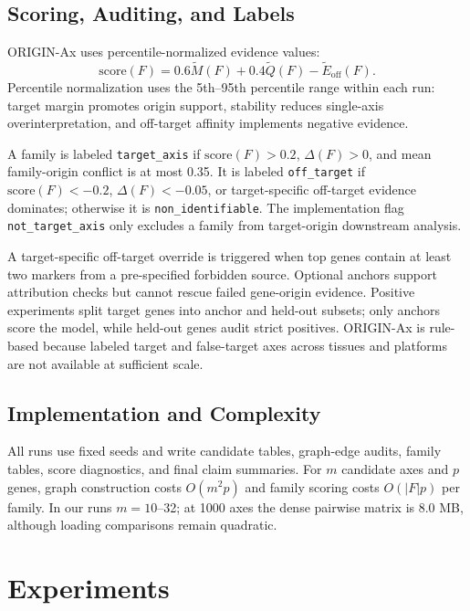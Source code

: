 \documentclass[conference]{IEEEtran}
\begin{document}
\subsection{Scoring, Auditing, and Labels}

ORIGIN-Ax uses percentile-normalized evidence values:
\begin{equation}
\mathrm{score}(F)=0.6\widetilde{M}(F)+0.4\widetilde{Q}(F)
-\widetilde{E}_{\mathrm{off}}(F).
\end{equation}
Percentile normalization uses the 5th--95th percentile range within each run:
target margin promotes origin support, stability reduces single-axis
overinterpretation, and off-target affinity implements negative evidence.

A family is labeled \texttt{target\_axis} if $\mathrm{score}(F)>0.2$,
$\Delta(F)>0$, and mean family-origin conflict is at most 0.35. It is labeled
\texttt{off\_target} if $\mathrm{score}(F)<-0.2$, $\Delta(F)<-0.05$, or
target-specific off-target evidence dominates; otherwise it is
\texttt{non\_identifiable}. The implementation flag \texttt{not\_target\_axis}
only excludes a family from target-origin downstream analysis.

A target-specific off-target override is triggered when top genes contain at
least two markers from a pre-specified forbidden source. Optional anchors support
attribution checks but cannot rescue failed gene-origin evidence. Positive
experiments split target genes into anchor and held-out subsets; only anchors
score the model, while held-out genes audit strict positives. ORIGIN-Ax is
rule-based because labeled target and false-target axes across tissues and
platforms are not available at sufficient scale.

\subsection{Implementation and Complexity}

All runs use fixed seeds and write candidate tables, graph-edge audits, family
tables, score diagnostics, and final claim summaries. For $m$ candidate axes and
$p$ genes, graph construction costs $O(m^2p)$ and family scoring costs
$O(|F|p)$ per family. In our runs $m=10$--32; at 1000 axes the dense pairwise
matrix is 8.0 MB, although loading comparisons remain quadratic.

\section{Experiments}
\end{document}
